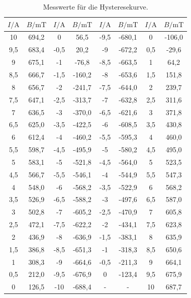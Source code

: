 \begin{table}
  \centering
  \caption{Messwerte für die Hysteresekurve.}
  \label{tab:7}
  \begin{tabular}{c c| c c| c c|c c}
    \toprule
    $I/\si{\ampere}$ & $B/\si{\milli\tesla}$ & $I/\si{\ampere}$ & $B/\si{\milli\tesla}$& $I/\si{\ampere}$ & $B/\si{\milli\tesla}$& $I/\si{\ampere}$ & $B/\si{\milli\tesla}$ \\
    \midrule
    10    & 694,2 & 0     & 56,5 &-9,5  &-680,1&0     &-106,0   \\
    9,5   & 683,4 & -0,5  & 20,2 &-9    &-672,2&0,5   & -29,6  \\
    9     & 675,1 & -1    & -76,8&-8,5  &-663,5&1     &  64,2   \\
    8,5   & 666,7 & -1,5  &-160,2&-8    &-653,6&1,5   & 151,8   \\
    8     & 656,7 & -2    &-241,7&-7,5  &-644,0&2     & 239,7   \\
    7,5   & 647,1 & -2,5  &-313,7&-7    &-632,8&2,5   & 311,6   \\
    7     & 636,5 & -3    &-370,0&-6,5  &-621,6&3     & 371,8   \\
    6,5   & 625,0 & -3,5  &-422,5&-6    &-608,5&3,5   & 430,8   \\
    6     & 612,4 & -4    &-460,2&-5,5  &-595,3&4     & 460,0   \\
    5,5   & 598,7 & -4,5  &-495,9&-5    &-580,2&4,5   & 495,0   \\
    5     & 583,1 & -5    &-521,8&-4,5  &-564,0&5     & 523,5   \\
    4,5   & 566,7 & -5,5  &-546,1&-4    &-544,9&5,5   & 547,3   \\
    4     & 548,0 & -6    &-568,2&-3,5  &-522,9&6     & 568,2   \\
    3,5   & 526,9 & -6,5  &-588,2&-3    &-497,6&6,5   & 587,0   \\
    3     & 502,8 & -7    &-605,2&-2,5  &-470,9&7     & 605,8   \\
    2,5   & 472,1 & -7,5  &-622,2&-2    &-434,1&7,5   & 623,8   \\
    2     & 436,9 & -8    &-636,9&-1,5  &-383,1&8     & 635,9   \\
    1,5   & 386,8 & -8,5  &-651,3&-1    &-318,3&8,5   & 650,6   \\
    1     & 308,3 & -9    &-664,6&-0,5  &-211,3&9     & 664,1   \\
    0,5   & 212,0 & -9,5  &-676,9&0     &-123,4&9,5   & 675,9   \\
    0     & 126,5 & -10   &-688,4& - & -       &10    & 687,7   \\
    \bottomrule
  \end{tabular}
\end{table}


